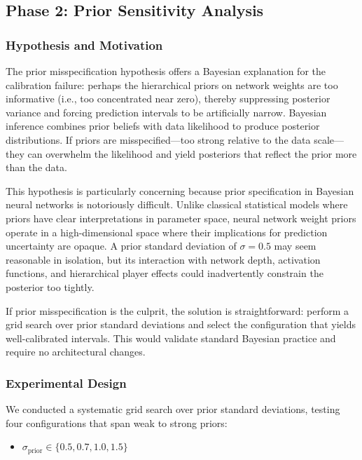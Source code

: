 \subsection{Phase 2: Prior Sensitivity Analysis}
\label{subsec:phase2_priors}

\subsubsection{Hypothesis and Motivation}

The prior misspecification hypothesis offers a Bayesian explanation for the calibration failure: perhaps the hierarchical priors on network weights are too informative (i.e., too concentrated near zero), thereby suppressing posterior variance and forcing prediction intervals to be artificially narrow. Bayesian inference combines prior beliefs with data likelihood to produce posterior distributions. If priors are misspecified—too strong relative to the data scale—they can overwhelm the likelihood and yield posteriors that reflect the prior more than the data.

This hypothesis is particularly concerning because prior specification in Bayesian neural networks is notoriously difficult. Unlike classical statistical models where priors have clear interpretations in parameter space, neural network weight priors operate in a high-dimensional space where their implications for prediction uncertainty are opaque. A prior standard deviation of $\sigma = 0.5$ may seem reasonable in isolation, but its interaction with network depth, activation functions, and hierarchical player effects could inadvertently constrain the posterior too tightly.

If prior misspecification is the culprit, the solution is straightforward: perform a grid search over prior standard deviations and select the configuration that yields well-calibrated intervals. This would validate standard Bayesian practice and require no architectural changes.

\subsubsection{Experimental Design}

We conducted a systematic grid search over prior standard deviations, testing four configurations that span weak to strong priors:

\begin{itemize}
    \item $\sigma_{\text{prior}} \in \{0.5, 0.7, 1.0, 1.5\}$
\end{itemize}

